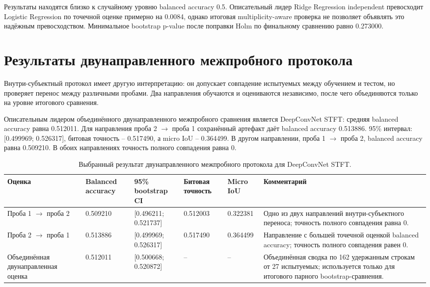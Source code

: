 Результаты находятся близко к случайному уровню balanced accuracy 0.5.
Описательный лидер Ridge Regression independent превосходит Logistic
Regression по точечной оценке примерно на 0.0084, однако итоговая
multiplicity-aware проверка не позволяет объявлять это надёжным
превосходством. Минимальное bootstrap p-value после поправки Holm по финальному
сравнению равно 0.273000.

\section{Результаты двунаправленного межпробного протокола}

Внутри-субъектный протокол имеет другую интерпретацию: он допускает совпадение
испытуемых между обучением и тестом, но проверяет перенос между различными
пробами. Два направления обучаются и оцениваются независимо, после чего
объединяются только на уровне итогового сравнения.

Описательным лидером объединённого двунаправленного межпробного сравнения является
DeepConvNet STFT: средняя balanced accuracy равна 0.512011. Для направления
проба 2 $\rightarrow$ проба 1 сохранённый артефакт даёт balanced accuracy
0.513886. 95\% интервал: [0.499969; 0.526317], битовая точность --
0.517490, а micro IoU -- 0.364499.
В другом направлении, проба 1 $\rightarrow$ проба 2, balanced accuracy равна
0.509210. В обоих направлениях точность полного совпадения равна 0.

\begin{table}[!t]
  \centering
  \small
  \setlength{\tabcolsep}{3pt}
  \renewcommand{\arraystretch}{1.15}
  \caption{Выбранный результат двунаправленного межпробного протокола для DeepConvNet STFT.}
  \label{tab:within-subject-results}
  \begin{tabularx}{\textwidth}{|L{33mm}|L{24mm}|L{26mm}|L{18mm}|L{18mm}|Y|}
    \hline
    Оценка & Balanced accuracy & 95\% bootstrap CI & Битовая точность & Micro IoU & Комментарий \\
    \hline
    Проба 1 $\rightarrow$ проба 2 &
    0.509210 & [0.496211; 0.521737] & 0.512003 & 0.322381 &
    Одно из двух направлений внутри-субъектного переноса; точность полного совпадения равна 0. \\
    \hline
    Проба 2 $\rightarrow$ проба 1 &
    0.513886 & [0.499969; 0.526317] & 0.517490 & 0.364499 &
    Направление с большей точечной оценкой balanced accuracy; точность полного совпадения
    равен 0. \\
    \hline
    Объединённая двунаправленная оценка &
    0.512011 & [0.500668; 0.520872] & -- & -- &
    Объединённая сводка по 162 удержанным строкам от 27 испытуемых; используется
    только для итогового парного bootstrap-сравнения. \\
    \hline
  \end{tabularx}
\end{table}

